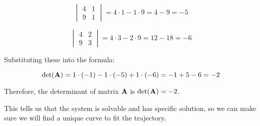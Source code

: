 \documentclass[12pt,a4paper]{article}
\begin{document}
\begin{solution}
\[
\begin{vmatrix}
4 & 1 \\
9 & 1
\end{vmatrix}
= 4 \cdot 1 - 1 \cdot 9 = 4 - 9 = -5
\]

\[
\begin{vmatrix}
4 & 2 \\
9 & 3
\end{vmatrix}
= 4 \cdot 3 - 2 \cdot 9 = 12 - 18 = -6
\]

Substituting these into the formula:

\[
\det(\mathbf{A}) = 1 \cdot (-1) - 1 \cdot (-5) + 1 \cdot (-6) = -1 + 5 - 6 = -2
\]

Therefore, the determinant of matrix \(\mathbf{A}\) is $\det(\mathbf{A}) = -2$.

This tells us that the system is solvable and has specific solution, so we can make sure we will find a unique curve to fit the trajectory.
\end{solution}
\end{document}
